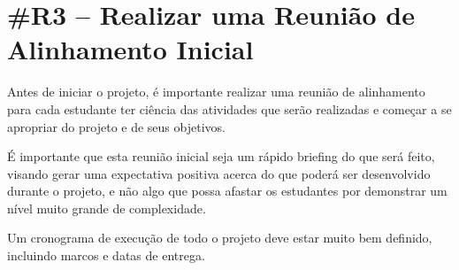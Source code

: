 \section*{\#R3 – Realizar uma Reunião de Alinhamento Inicial}

Antes de iniciar o projeto, é importante realizar uma reunião de alinhamento para cada estudante ter ciência das atividades que serão realizadas e começar a se apropriar do projeto e de seus objetivos.

É importante que esta reunião inicial seja um rápido briefing do que será feito, visando gerar uma expectativa positiva acerca do que poderá ser desenvolvido durante o projeto, e não algo que possa afastar os estudantes por demonstrar um nível muito grande de complexidade.

Um cronograma de execução de todo o projeto deve estar muito bem definido, incluindo marcos e datas de entrega.